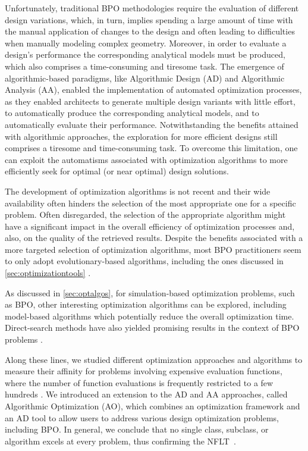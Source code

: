 Unfortunately, traditional \ac{BPO} methodologies require the evaluation of different design variations, which, in turn, implies spending a large amount of time with the manual application of changes to the design and often leading to difficulties when manually modeling complex geometry. Moreover, in order to evaluate a design's performance the corresponding analytical models must be produced, which also comprises a time-consuming and tiresome task. The emergence of algorithmic-based paradigms, like Algorithmic Design (\ac{AD}) and Algorithmic Analysis (\ac{AA}), enabled the implementation of automated optimization processes, as they enabled architects to generate multiple design variants with little effort, to automatically produce the corresponding analytical models, and to automatically evaluate their performance. Notwithstanding the benefits attained with algorithmic approaches, the exploration for more efficient designs still comprises a tiresome and time-consuming task. To overcome this limitation, one can exploit the automatisms associated with optimization algorithms to more efficiently seek for optimal (or near optimal) design solutions.

The development of optimization algorithms is not recent and their wide availability often hinders the selection of the most appropriate one for a specific problem. Often disregarded, the selection of the appropriate algorithm might have a significant impact in the overall efficiency of optimization processes and, also, on the quality of the retrieved results\cite{Wolpert1997NFLT}. Despite the benefits associated with a more targeted selection of optimization algorithms, most \ac{BPO} practitioners seem to only adopt evolutionary-based algorithms, including the ones discussed in \cref{sec:optimizationtools} \cite{Evins2013,Nguyen2014}. 

As discussed in \cref{sec:optalgos}, for simulation-based optimization problems, such as \ac{BPO}, other interesting optimization algorithms can be explored, including model-based algorithms which potentially reduce the overall optimization time\cite{Wortmann2017GABESTCHOICE}. Direct-search methods have also yielded promising results in the context of \ac{BPO} problems \cite{Waibel2018}. 

Along these lines, we studied different optimization approaches and algorithms to measure their affinity for problems involving expensive evaluation functions, where the number of function evaluations is frequently restricted to a few hundreds \cite{Caetano2018,Belem2018optimizeddesign,Belem2019MOO}. We introduced an extension to the \ac{AD} and \ac{AA} approaches, called Algorithmic Optimization (\ac{AO}), which combines an optimization framework and an \ac{AD} tool to allow users to address various design optimization problems, including \ac{BPO}. In general, we conclude that no single class, subclass, or algorithm excels at every problem, thus confirming the \ac{NFLT}~\cite{Wolpert1997NFLT}.  

